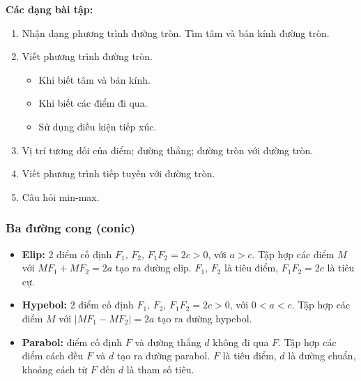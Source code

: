 \documentclass[12pt,a4paper]{article}
\begin{document}
\medskip\noindent\textbf{Các dạng bài tập:}
\begin{enumerate}[label=\textbf{Dạng \arabic*:}, leftmargin=*, align=left]
  \item Nhận dạng phương trình đường tròn. Tìm tâm và bán kính đường tròn.
  \item Viết phương trình đường tròn.
    \begin{itemize}
      \item Khi biết tâm và bán kính.
      \item Khi biết các điểm đi qua.
      \item Sử dụng điều kiện tiếp xúc.
    \end{itemize}
  \item Vị trí tương đối của điểm; đường thẳng; đường tròn với đường tròn.
  \item Viết phương trình tiếp tuyến với đường tròn.
  \item Câu hỏi min-max.
\end{enumerate}

\subsubsection{Ba đường cong (conic)}

\begin{dinhnghia}
  \begin{itemize}
    \item \textbf{Elip:} 2 điểm cố định $F_1,\, F_2$, $F_1F_2 = 2c > 0$, với $a > c$. Tập hợp các điểm $M$ với $MF_1 + MF_2 = 2a$ tạo ra đường elip. $F_1,\, F_2$ là tiêu điểm, $F_1F_2 = 2c$ là tiêu cự.
    \item \textbf{Hypebol:} 2 điểm cố định $F_1,\, F_2$, $F_1F_2 = 2c > 0$, với $0 < a < c$. Tập hợp các điểm $M$ với $|MF_1 - MF_2| = 2a$ tạo ra đường hypebol.
    \item \textbf{Parabol:} điểm cố định $F$ và đường thẳng $d$ không đi qua $F$. Tập hợp các điểm cách đều $F$ và $d$ tạo ra đường parabol. $F$ là tiêu điểm, $d$ là đường chuẩn, khoảng cách từ $F$ đến $d$ là tham số tiêu.
  \end{itemize}
\end{dinhnghia}
\end{document}
